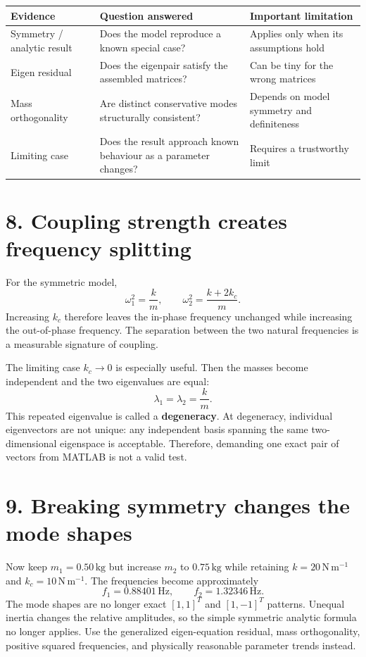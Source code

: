 \documentclass[11pt,a4paper]{article}
\begin{document}
\begin{center}
\small
\begin{tabular}{>{\raggedright\arraybackslash}p{.24\linewidth}>{\raggedright\arraybackslash}p{.33\linewidth}>{\raggedright\arraybackslash}p{.33\linewidth}}
\toprule
\textbf{Evidence} & \textbf{Question answered} & \textbf{Important limitation}\\ \midrule
Symmetry / analytic result & Does the model reproduce a known special case? & Applies only when its assumptions hold\\
Eigen residual & Does the eigenpair satisfy the assembled matrices? & Can be tiny for the wrong matrices\\
Mass orthogonality & Are distinct conservative modes structurally consistent? & Depends on model symmetry and definiteness\\
Limiting case & Does the result approach known behaviour as a parameter changes? & Requires a trustworthy limit\\ \bottomrule
\end{tabular}
\end{center}

\section*{8. Coupling strength creates frequency splitting}
For the symmetric model,
\begin{equation}
 \omega_1^2=\frac{k}{m},\qquad
 \omega_2^2=\frac{k+2k_c}{m}.
\end{equation}
Increasing $k_c$ therefore leaves the in-phase frequency unchanged while increasing the out-of-phase frequency. The separation between the two natural frequencies is a measurable signature of coupling.

The limiting case $k_c\rightarrow0$ is especially useful. Then the masses become independent and the two eigenvalues are equal:
\begin{equation}
 \lambda_1=\lambda_2=\frac{k}{m}.
\end{equation}
This repeated eigenvalue is called a \textbf{degeneracy}. At degeneracy, individual eigenvectors are not unique: any independent basis spanning the same two-dimensional eigenspace is acceptable. Therefore, demanding one exact pair of vectors from MATLAB is not a valid test.

\section*{9. Breaking symmetry changes the mode shapes}
Now keep $m_1=0.50\,\mathrm{kg}$ but increase $m_2$ to $0.75\,\mathrm{kg}$ while retaining $k=20\,\mathrm{N\,m^{-1}}$ and $k_c=10\,\mathrm{N\,m^{-1}}$. The frequencies become approximately
\begin{equation}
 f_1=0.88401\,\mathrm{Hz},\qquad f_2=1.32346\,\mathrm{Hz}.
\end{equation}
The mode shapes are no longer exact $[1,1]^T$ and $[1,-1]^T$ patterns. Unequal inertia changes the relative amplitudes, so the simple symmetric analytic formula no longer applies. Use the generalized eigen-equation residual, mass orthogonality, positive squared frequencies, and physically reasonable parameter trends instead.
\end{document}
